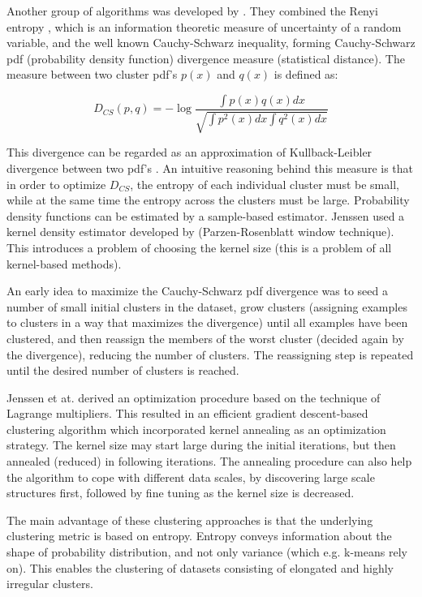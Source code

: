 \documentclass[conference]{IEEEtran}
\begin{document}
Another group of algorithms was developed by \cite{jenssen03,jenssen05}. They combined
the Renyi entropy \cite{renyi61}, which is an information theoretic measure of uncertainty of a random variable,
and the well known Cauchy-Schwarz inequality, forming Cauchy-Schwarz pdf (probability density function)
divergence measure (statistical distance). The measure between two cluster pdf's $p(x)$ and $q(x)$ is defined as:

\begin{equation}
\label{CS}
D_{CS}(p, q) = -\log \frac{\int p(x)q(x)dx}{\sqrt{\int p^2(x)dx \int q^2(x)dx}}
\end{equation}

This divergence can be regarded as an approximation of Kullback-Leibler divergence between two pdf's \cite{jenssen03}.
An intuitive reasoning behind this measure is that in order to optimize $D_{CS}$, the entropy of each individual cluster must
be small, while at the same time the entropy across the clusters must be large.
Probability density functions can be estimated by a sample-based estimator. Jenssen \cite{jenssen05} used a kernel
density estimator developed by \cite{parzen62} (Parzen-Rosenblatt window technique). This introduces a problem of
choosing the kernel size (this is a problem of all kernel-based methods).

An early idea to maximize the Cauchy-Schwarz pdf divergence was to seed a number
of small initial clusters in the dataset, grow clusters (assigning examples to clusters
in a way that maximizes the divergence) until all examples have been clustered, and then
reassign the members of the worst cluster (decided again by the divergence), reducing the number of clusters. 
The reassigning step is repeated until the desired number of clusters is reached.

Jenssen et at. \cite{jenssen07} derived an optimization procedure based on the technique of Lagrange multipliers.
This resulted in an efficient gradient descent-based clustering algorithm which incorporated kernel annealing
as an optimization strategy. The kernel size may start large during the initial iterations, but then annealed (reduced)
in following iterations. The annealing procedure can also help the algorithm to cope with different data scales,
by discovering large scale structures first, followed by fine tuning as the kernel size is decreased.

The main advantage of these clustering approaches is that the underlying clustering metric is
based on entropy. Entropy conveys information about the shape of probability distribution,
and not only variance (which e.g. k-means rely on). This enables the clustering of datasets consisting of
elongated and highly irregular clusters.
\end{document}
